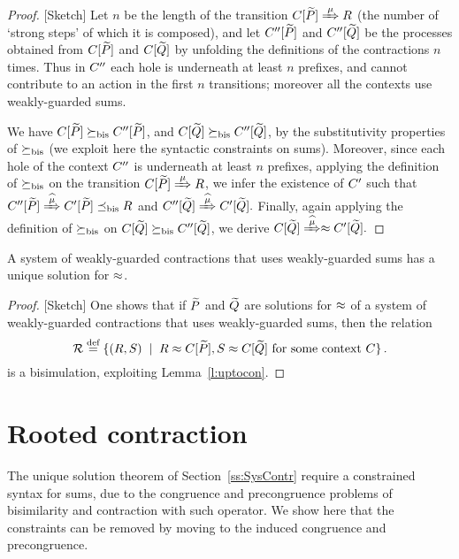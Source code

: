 \begin{proof}{[Sketch]}
Let $n$ be the length of the transition $\ct{\til P}\Arr\mu R$  (the
number of `strong steps' of which it is composed), and  
let $C'' [\widetilde P]$ and $C'' [\widetilde Q]$  be the processes obtained
from  $C [\widetilde P]$ and $C [\widetilde Q]$ by unfolding the definitions
of the contractions $n$ times. Thus in $C''$ each hole is
underneath at least $n$ prefixes, and cannot contribute to an action
in the first $n$ transitions; moreover all the contexts use
weakly-guarded sums. 


We have $C [\widetilde P] \mathrel{\succeq_{\rm{bis}}} C'' [\widetilde P]$, and 
$C [\widetilde Q] \mathrel{\succeq_{\rm{bis}}} C'' [\widetilde Q]$, 
 by the substitutivity  properties of $\mathrel{\succeq_{\rm{bis}}}$ (we exploit here
 the syntactic constraints on sums). Moreover,
 since each hole of the  context $C''$ is underneath at least $n$
 prefixes, applying  
the definition
 of $ \mathrel{\succeq_{\rm{bis}}}$ on the transition 
 $\ct{\til P}\Arr{\mu}  R$, we infer the existence
 of $C'$ such that 
$
\ctpp{\til P}\Arcap{\mu} \ctp{\til P} \mexpaBIS R
$
and 
$
\ctpp{\til Q}\Arcap{\mu}  \ctp{\til Q} 
. $
Finally, again applying the definition of $\mathrel{\succeq_{\rm{bis}}}$ on 
$C [\widetilde Q] \mathrel{\succeq_{\rm{bis}}} C'' [\widetilde Q]$, 
we derive 
$
\ct{\til Q}\Arcap{\mu}  \wb \ctp{\til Q} 
.$
\end{proof}

\begin{theorem}
\label{t:contraBisimulationU}
A system of weakly-guarded contractions
 that uses  weakly-guarded sums    has 
a unique solution 
 for $\approx$.
\end{theorem} 

\begin{proof}{[Sketch]}
One shows that if $\widetilde P$ and $\widetilde Q$ are solutions for $\approx$ of a system of weakly-guarded
contractions that uses weakly-guarded sums,  then the
 relation 
\[{\cal R} \stackrel{\mbox{\scriptsize def}}{=} \{ 
(R,S) \; \mid \; R \approx C [\widetilde P], S \approx C [\widetilde Q] \mbox{ for some context
$C$} \} \, . 
\]
 is a bisimulation, exploiting 
 Lemma~\ref{l:uptocon}.
\end{proof} 


\section{Rooted contraction}
\label{ss:new}

The unique solution theorem of Section~\ref{ss:SysContr} require a
constrained syntax for sums, due to the congruence and precongruence
problems of bisimilarity and contraction with such operator. 
We show here that the constraints can be
removed by moving to the induced congruence and precongruence.

